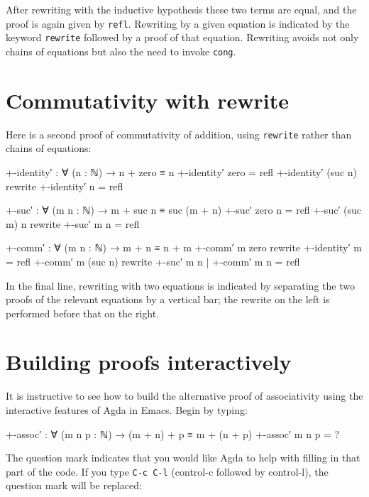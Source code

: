After rewriting with the inductive hypothesis these two terms are equal,
and the proof is again given by \texttt{refl}. Rewriting by a given
equation is indicated by the keyword \texttt{rewrite} followed by a
proof of that equation. Rewriting avoids not only chains of equations
but also the need to invoke \texttt{cong}.

\hypertarget{commutativity-with-rewrite}{%
\section{Commutativity with rewrite}\label{commutativity-with-rewrite}}

Here is a second proof of commutativity of addition, using
\texttt{rewrite} rather than chains of equations:

\begin{fence}
\begin{code}
+-identity′ : ∀ (n : ℕ) → n + zero ≡ n
+-identity′ zero = refl
+-identity′ (suc n) rewrite +-identity′ n = refl

+-suc′ : ∀ (m n : ℕ) → m + suc n ≡ suc (m + n)
+-suc′ zero n = refl
+-suc′ (suc m) n rewrite +-suc′ m n = refl

+-comm′ : ∀ (m n : ℕ) → m + n ≡ n + m
+-comm′ m zero rewrite +-identity′ m = refl
+-comm′ m (suc n) rewrite +-suc′ m n | +-comm′ m n = refl
\end{code}
\end{fence}

In the final line, rewriting with two equations is indicated by
separating the two proofs of the relevant equations by a vertical bar;
the rewrite on the left is performed before that on the right.

\hypertarget{building-proofs-interactively}{%
\section{Building proofs
interactively}\label{building-proofs-interactively}}

It is instructive to see how to build the alternative proof of
associativity using the interactive features of Agda in Emacs. Begin by
typing:

\begin{myDisplay}
+-assoc′ : ∀ (m n p : ℕ) → (m + n) + p ≡ m + (n + p)
+-assoc′ m n p = ?
\end{myDisplay}

The question mark indicates that you would like Agda to help with
filling in that part of the code. If you type \texttt{C-c\ C-l}
(control-c followed by control-l), the question mark will be replaced:

